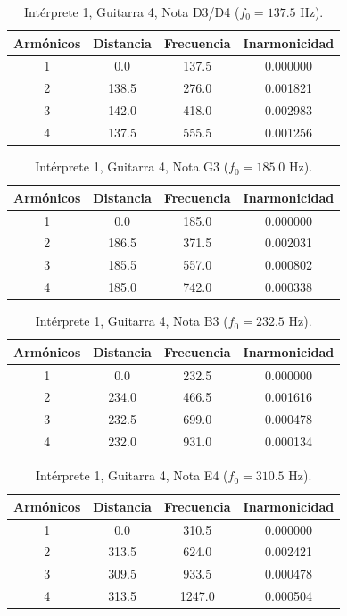 \begin{table}[htbp]
  \centering
 \small
  \caption{Intérprete 1, Guitarra 4, Nota D3/D4 ($f_0 = 137.5$ Hz).}
  \label{tab:interprete1_g4_d3_d4}
  \begin{tabular}{cccc}
  \toprule
  Armónicos & Distancia & Frecuencia & Inarmonicidad \\
  \midrule
  1 & 0.0 & 137.5 & 0.000000 \\
  2 & 138.5 & 276.0 & 0.001821 \\
  3 & 142.0 & 418.0 & 0.002983 \\
  4 & 137.5 & 555.5 & 0.001256 \\
  \bottomrule
  \end{tabular}
\end{table}

\begin{table}[htbp]
  \centering
 \small
  \caption{Intérprete 1, Guitarra 4, Nota G3 ($f_0 = 185.0$ Hz).}
  \label{tab:interprete1_g4_g3}
  \begin{tabular}{cccc}
  \toprule
  Armónicos & Distancia & Frecuencia & Inarmonicidad \\
  \midrule
  1 & 0.0 & 185.0 & 0.000000 \\
  2 & 186.5 & 371.5 & 0.002031 \\
  3 & 185.5 & 557.0 & 0.000802 \\
  4 & 185.0 & 742.0 & 0.000338 \\
  \bottomrule
  \end{tabular}
\end{table}

\begin{table}[htbp]
  \centering
 \small
  \caption{Intérprete 1, Guitarra 4, Nota B3 ($f_0 = 232.5$ Hz).}
  \label{tab:interprete1_g4_b3}
  \begin{tabular}{cccc}
  \toprule
  Armónicos & Distancia & Frecuencia & Inarmonicidad \\
  \midrule
  1 & 0.0 & 232.5 & 0.000000 \\
  2 & 234.0 & 466.5 & 0.001616 \\
  3 & 232.5 & 699.0 & 0.000478 \\
  4 & 232.0 & 931.0 & 0.000134 \\
  \bottomrule
  \end{tabular}
\end{table}

\begin{table}[htbp]
  \centering
 \small
  \caption{Intérprete 1, Guitarra 4, Nota E4 ($f_0 = 310.5$ Hz).}
  \label{tab:interprete1_g4_e4}
  \begin{tabular}{cccc}
  \toprule
  Armónicos & Distancia & Frecuencia & Inarmonicidad \\
  \midrule
  1 & 0.0 & 310.5 & 0.000000 \\
  2 & 313.5 & 624.0 & 0.002421 \\
  3 & 309.5 & 933.5 & 0.000478 \\
  4 & 313.5 & 1247.0 & 0.000504 \\
  \bottomrule
  \end{tabular}
\end{table}


